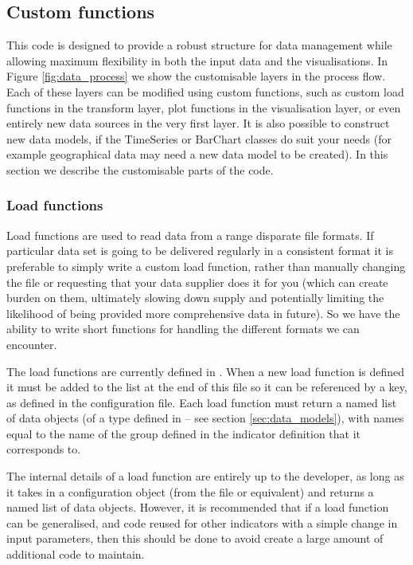 \documentclass[12pt]{article}
\begin{document}
\subsection{Custom functions}\label{sec:custom_functions}

This code is designed to provide a robust structure for data management while allowing maximum flexibility in both the input data and the visualisations.  In Figure \ref{fig:data_process} we show the customisable layers in the process flow.  Each of these layers can be modified using custom functions, such as custom load functions in the transform layer, plot functions in the visualisation layer, or even entirely new data sources in the very first layer.  It is also possible to construct new data models, if the TimeSeries or BarChart classes do suit your needs (for example geographical data may need a new data model to be created).  In this section we describe the customisable parts of the code.

\subsubsection{Load functions}

Load functions are used to read data from a range disparate file formats.  If particular data set is going to be delivered regularly in a consistent format it is preferable to simply write a custom load function, rather than manually changing the file or requesting that your data supplier does it for you (which can create burden on them, ultimately slowing down supply and potentially limiting the likelihood of being provided more comprehensive data in future).  So we have the ability to write short functions for handling the different formats we can encounter.

The load functions are currently defined in .  When a new load function is defined it must be added to the list at the end of this file so it can be referenced by a key, as defined in the configuration file. Each load function must return a named list of data objects (of a type defined in  -- see section \ref{sec:data_models}), with names equal to the name of the group defined in the indicator definition that it corresponds to.

The internal details of a load function are entirely up to the developer, as long as it takes in a configuration object (from the  file or equivalent) and returns a named list of data objects.  However, it is recommended that if a load function can be generalised, and code reused for other indicators with a simple change in input parameters, then this should be done to avoid create a large amount of additional code to maintain.
\end{document}
